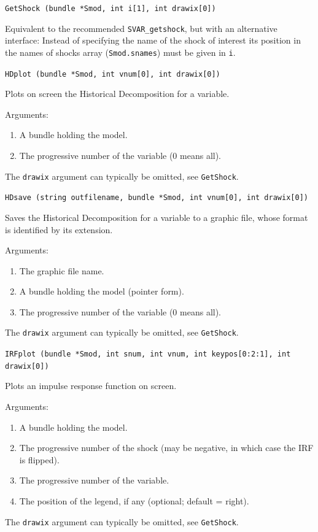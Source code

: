 \documentclass[a4paper,10pt]{article}
\newenvironment{funcdoc}[1]
{\noindent\hrulefill\newline\nopagebreak\texttt{#1}%
\nopagebreak\par\noindent\hrulefill%
\nopagebreak\par\nopagebreak\smallskip\nopagebreak\par}
{\bigskip}
\begin{document}
\begin{funcdoc}{GetShock (bundle *Smod, int i[1], int drawix[0])}
  \noindent Equivalent to the recommended \texttt{SVAR\_getshock}, but with an alternative
  interface: 
  Instead of specifying the name of the shock of interest its position in the 
  names of shocks array (\texttt{Smod.snames}) must be given in \texttt{i}.
\end{funcdoc}

\begin{funcdoc}{HDplot (bundle *Smod, int vnum[0], int drawix[0])}
  \noindent Plots on screen the Historical Decomposition for a variable. 
  
   \noindent Arguments:
  \begin{enumerate}
  \item A bundle holding the model.
  \item The progressive number of the variable (0 means all).
  \end{enumerate}
  
  The \texttt{drawix} argument can typically be omitted, see \texttt{GetShock}.
\end{funcdoc}

\begin{funcdoc}{HDsave (string outfilename, bundle *Smod, int vnum[0], int drawix[0])}
    \noindent Saves the Historical Decomposition for a variable to a graphic file,
  whose format is identified by its extension. 
  
   \noindent Arguments:
  \begin{enumerate}
  \item The graphic file name.
  \item A bundle holding the model (pointer form).
  \item The progressive number of the variable (0 means all).
  \end{enumerate}
  
  The \texttt{drawix} argument can typically be omitted, see \texttt{GetShock}.
\end{funcdoc}

\begin{funcdoc}{IRFplot (bundle *Smod, int snum, int vnum, int keypos[0:2:1], int drawix[0])}
  \noindent Plots an impulse response function on screen. 
  
   \noindent Arguments:
  
  \begin{enumerate}
  \item A bundle holding the model.
  \item The progressive number of the shock (may be negative, in which
    case the IRF is flipped).
  \item The progressive number of the variable.
  \item The position of the legend, if any (optional; default = right).
  \end{enumerate}
  
   The \texttt{drawix} argument can typically be omitted, see \texttt{GetShock}.
\end{funcdoc}
\end{document}
